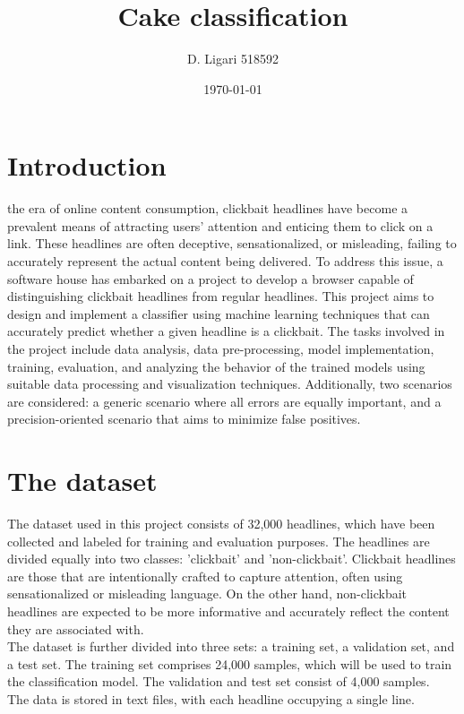 \documentclass{class}
\title{Cake classification}
\author[1]{D. Ligari 518592}
\affil[1]{Machine Learning course, University of Pavia, Department of Computer Engineering (Data Science), Pavia, Italy}
\date{\today}
\begin{document}
\maketitle
\thispagestyle{FirstPage}
\tableofcontents
\section{Introduction}
the era of online content consumption, clickbait headlines have become a prevalent means of attracting users' attention and enticing them to click on a link.
These headlines are often deceptive, sensationalized, or misleading, failing to accurately represent the actual content being delivered.
To address this issue, a software house has embarked on a project to develop a browser capable of distinguishing clickbait headlines from regular headlines.
This project aims to design and implement a classifier using machine learning techniques that can accurately predict whether a given headline is a clickbait.
The tasks involved in the project include data analysis, data pre-processing, model implementation, training, evaluation, and analyzing the behavior
of the trained models using suitable data processing and visualization techniques.
Additionally, two scenarios are considered: a generic scenario where all errors are equally important, and a precision-oriented scenario
that aims to minimize false positives.

\section{The dataset}
The dataset used in this project consists of 32,000 headlines, which have been collected and labeled for training and evaluation purposes.
The headlines are divided equally into two classes: 'clickbait' and 'non-clickbait'.
Clickbait headlines are those that are intentionally crafted to capture attention,
often using sensationalized or misleading language.
On the other hand, non-clickbait headlines are expected to be more informative and accurately reflect the content they are associated with.\\
The dataset is further divided into three sets: a training set, a validation set, and a test set.
The training set comprises 24,000 samples, which will be used to train the classification model. The validation and test set consist of 4,000 samples.\\
The data is stored in text files, with each headline occupying a single line.
\end{document}
